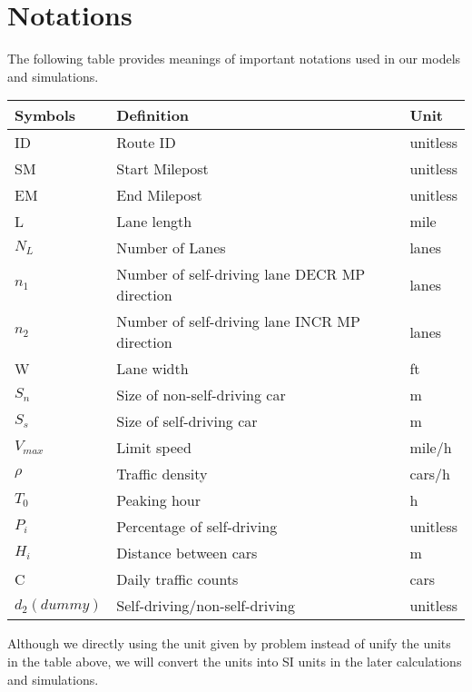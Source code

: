 \documentclass{mcmthesis}
\numberwithin{equation}{section}
\begin{document}
	\section{Notations}
		The following table provides meanings of important notations used in our models and simulations.
		\begin{table}[H]
			\caption{Notations}
			\begin{center}
				\begin{longtable}{m{80pt}<{\centering} m{260pt} m{50pt}}
					\hline
					Symbols 		& 	Definition 										& 	Unit		\\
					\hline
					ID 				& 	Route ID 										& 	unitless	\\
					SM 				& 	Start Milepost 									& 	unitless	\\
					EM 				& 	End Milepost 									& 	unitless	\\
					L 				& 	Lane length										& 	mile 	 	\\
					$N_{L}$ 		& 	Number of Lanes 		 						& 	lanes 		\\
					$n_{1}$ 		& 	Number of self-driving lane DECR MP direction 	& 	lanes 		\\
					$n_{2}$ 		& 	Number of self-driving lane INCR MP direction 	& 	lanes 		\\
					W 				& 	Lane width 										& 	ft 			\\
					$S_{n}$ 		& 	Size of non-self-driving car 					& 	m 			\\
					$S_{s}$ 		& 	Size of self-driving car 						& 	m 			\\
					$V_{max}$ 		& 	Limit speed 									& 	mile/h 		\\
					$\rho$ 			& 	Traffic density 								& 	cars/h 		\\
					$T_{0}$ 		& 	Peaking hour 									& 	h 			\\
					$P_{i}$ 		& 	Percentage of self-driving 						& 	unitless 	\\
					$H_{i}$ 		& 	Distance between cars 							& 	m 			\\
					C 				& 	Daily traffic counts 							& 	cars 		\\
					$d_{2}(dummy)$ 	& 	Self-driving/non-self-driving 					& 	unitless 	\\
					\hline
				\end{longtable}
			\end{center}
		\end{table}
		Although we directly using the unit given by problem instead of unify the units in the table above, we will convert the units into SI units in the later calculations and simulations.
\end{document}
